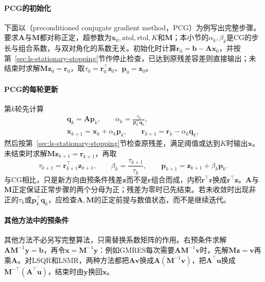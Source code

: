 \paragraph{PCG的初始化}
下面以（preconditioned conjugate gradient method，PCG）为例写出完整步骤。要求$\bm A$与$\bm M$都对称正定，超参数为$\bm x_0,\mathrm{atol},\mathrm{rtol},K$和$\bm M$；本小节的$\alpha_k,\beta_k$是CG的步长与组合系数，与双对角化的系数无关。初始化时计算$\bm r_0=\bm b-\bm A\bm x_0$，并按第~\ref{sec:ls-stationary-stopping}节作停止检查，已达到原残差容差则直接输出；未结束时求解$\bm M\bm z_0=\bm r_0$，取$\tau_0=\bm r_0^\top\bm z_0$、$\bm p_0=\bm z_0$。

\paragraph{PCG的每轮更新}
第$k$轮先计算
\[
 \begin{gathered}
 \bm q_k=\bm A\bm p_k,\qquad \alpha_k=\frac{\tau_k}{\bm p_k^\top\bm q_k},\\
 \bm x_{k+1}=\bm x_k+\alpha_k\bm p_k,\qquad \bm r_{k+1}=\bm r_k-\alpha_k\bm q_k ,
 \end{gathered}
\]
然后按第~\ref{sec:ls-stationary-stopping}节检查原残差，满足阈值或达到$K$时输出$\bm x$。未结束时求解$\bm M\bm z_{k+1}=\bm r_{k+1}$，再取
\[
 \tau_{k+1}=\bm r_{k+1}^\top\bm z_{k+1},\qquad
 \beta_k=\frac{\tau_{k+1}}{\tau_k},\qquad
 \bm p_{k+1}=\bm z_{k+1}+\beta_k\bm p_k .
\]
与CG相比，只是新方向由预条件残差$\bm z$而不是$\bm r$组合而成，内积$\bm r^\top\bm r$换成$\bm r^\top\bm z$。$\bm A$与$\bm M$正定保证正常步骤的两个分母为正；残差为零时已先结束。若未收敛时出现非正的$\tau_k$或$\bm p_k^\top\bm q_k$，应检查$\bm A,\bm M$的正定前提与数值状态，而不是继续迭代。

\paragraph{其他方法中的预条件}
其他方法不必另写完整算法，只需替换系数矩阵的作用。右预条件求解$\bm A\bm M^{-1}\bm y=\bm b$，再令$\bm x=\bm M^{-1}\bm y$：例如GMRES每次需要$\bm A\bm M^{-1}\bm v$时，先解$\bm M\bm z=\bm v$再乘$\bm A$。对LSQR和LSMR，两种方法都把$\bm A\bm v$换成$\bm A(\bm M^{-1}\bm v)$，把$\bm A^\top\bm u$换成$\bm M^{-\top}(\bm A^\top\bm u)$，结束时由$\bm y$换回$\bm x$。

